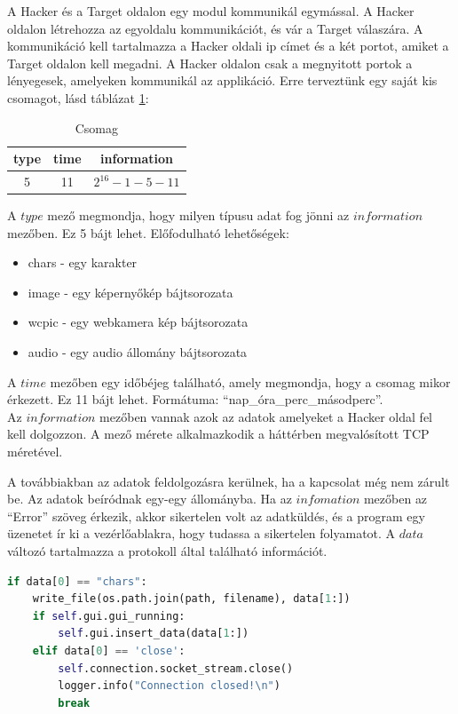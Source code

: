 \documentclass[12pt,a4paper,oneside]{report}
\begin{document}
A Hacker és a Target oldalon egy modul kommunikál egymással. A Hacker oldalon létrehozza az egyoldalu kommunikációt, és vár a Target válaszára. A kommunikáció kell tartalmazza a Hacker oldali ip címet és a két portot, amiket a Target oldalon kell megadni. A Hacker oldalon csak a megnyitott portok a lényegesek, amelyeken kommunikál az applikáció. Erre terveztünk egy saját kis csomagot, lásd táblázat \ref{tab:protocol}:
\begin{table}[H]
\centering
\caption{Csomag}
\label{tab:protocol}
\begin{tabular}{|c|c|c|}
\hline
\textbf{type} & \textbf{time} & \textbf{information} \\
\hline
5 & 11 & $2^{16}-1-5-11$ \\
\hline
\end{tabular}
\end{table}
A $type$ mező megmondja, hogy milyen típusu adat fog jönni az $information$ mezőben. Ez 5 bájt lehet. Előfodulható lehetőségek:
\begin{itemize}
\item chars - egy karakter
\item image - egy képernyőkép bájtsorozata
\item wcpic - egy webkamera kép bájtsorozata
\item audio - egy audio állomány bájtsorozata
\end{itemize}
A $time$ mezőben egy időbéjeg található, amely megmondja, hogy a csomag mikor érkezett. Ez 11 bájt lehet. Formátuma: ``nap\_óra\_perc\_másodperc''.\\
Az $information$ mezőben vannak azok az adatok amelyeket a Hacker oldal fel kell dolgozzon. A mező mérete alkalmazkodik a háttérben megvalósított TCP méretével.

A továbbiakban az adatok feldolgozásra kerülnek, ha a kapcsolat még nem zárult be. Az adatok beíródnak egy-egy állományba. Ha az $infomation$ mezőben az ``Error'' szöveg érkezik, akkor sikertelen volt az adatküldés, és a program egy üzenetet ír ki a vezérlőablakra, hogy tudassa a sikertelen folyamatot. A $data$ változó tartalmazza a protokoll által található információt.
\begin{lstlisting}[language=Python]
if data[0] == "chars":
	write_file(os.path.join(path, filename), data[1:])
	if self.gui.gui_running:
		self.gui.insert_data(data[1:])
	elif data[0] == 'close':
		self.connection.socket_stream.close()
		logger.info("Connection closed!\n")
		break
\end{lstlisting}
\end{document}
